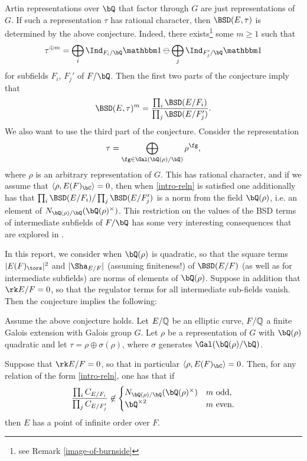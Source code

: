 Artin representations over $\bQ$ that factor through $G$ are just representations of $G$. If such a representation $\tau$ has rational character, then $\BSD(E, \tau)$ is determined by the above conjecture. Indeed, there exists\footnote{see Remark \ref{image-of-burnside}} some $m \geq 1$ such that
\begin{equation}\label{intro-reln}
     \tau^{\oplus m} = \bigoplus_i \Ind_{F_i / \bQ} \trivial \ominus \bigoplus_j\Ind_{F_j' / \bQ} \trivial
\end{equation}
for subfields $F_i$, $F_j'$ of $F / \bQ$. Then the first two parts of the conjecture imply that 
\[
\BSD(E, \tau)^{m} = \frac{\prod_i \BSD(E / F_i)}{\prod_j \BSD(E / F_j')} .
\]
We also want to use the third part of the conjecture. Consider the representation $$\tau = \bigoplus_{\fg \in \Gal(\bQ(\rho) / \bQ)} \rho^{\fg},$$
where $\rho$ is an arbitrary representation of $G$. This has rational character, and if we assume that $\langle \rho, E(F)_{\bC} \rangle = 0$, then when \eqref{intro-reln} is satisfied one additionally has that $\prod_i \BSD(E / F_i) / \prod_j \BSD(E / F_j')$ is a norm from the field $\bQ(\rho)$, i.e. an element of $N_{\bQ(\rho) / \bQ}(\bQ(\rho)^{\times})$.
This restriction on the values of the BSD terms of intermediate subfields of $F / \bQ$ has some very interesting consequences that are explored in \cite[\S3]{DEW1}.

In this report, we consider when $\bQ(\rho)$ is quadratic, so that the square terms $|E(F)_{\tors}|^2$ and $|\Sha_{E / F}|$ (assuming finiteness!) of $\BSD(E / F)$ (as well as for intermediate subfields) are norms of elements of $\bQ(\rho)$. Suppose in addition that $\rk E / F = 0$, so that the regulator terms for all intermediate sub-fields vanish. Then the conjecture implies the following:

\begin{thm*}[= Theorem \ref{thm_positive_rank}, 
    {\cite[Theorem 33]{DEW1}}]
    Assume the above conjecture holds. Let $E/\mathbb{Q}$ be an elliptic curve, $F/\mathbb{Q}$ a finite Galois extension with Galois group $G$. Let $\rho$ be a representation of $G$ with $\bQ(\rho)$ quadratic and let $\tau = \rho \oplus \sigma(\rho)$, where $\sigma$ generates $\Gal(\bQ(\rho) / \bQ)$. 
    
    Suppose that $\rk E / F = 0$, so that in particular $\langle \rho, E(F)_{\bC} \rangle = 0$.
    Then, for any relation of the form \eqref{intro-reln}, one has that if 
    $$\frac{\prod_i C_{E/F_i}}{\prod_j C_{E/F'_j}} \not\in \begin{cases} N_{\bQ(\rho) / \bQ}(\bQ(\rho)^{\times}) & m \text{ odd}, \\
        \bQ^{\times 2} & m \text{ even}.\end{cases}$$
    then $E$ has a point of infinite order over $F$.
\end{thm*}

